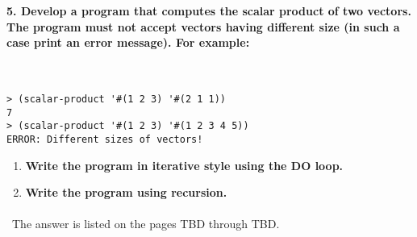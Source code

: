 \documentclass{article}
\begin{document}
\paragraph{}\
\paragraph{}\

\paragraph{5. Develop a program that computes the scalar product of two vectors. The program must not accept vectors having different size (in such a case print an error message). For example: }\

\begin{verbatim} 
> (scalar-product '#(1 2 3) '#(2 1 1))
7
> (scalar-product '#(1 2 3) '#(1 2 3 4 5))
ERROR: Different sizes of vectors!
\end{verbatim}

\begin{enumerate}[label=(\alph*)]

	\item \textbf{Write the program in iterative style using the DO loop.}
	
	\item \textbf{Write the program using recursion.}
					
\end{enumerate}

\paragraph{}\
	The answer is listed on the pages TBD through TBD.
	
	
\end{document}
